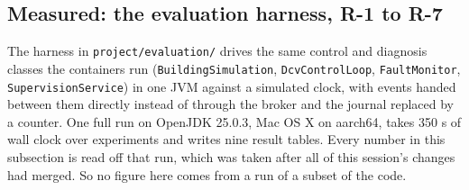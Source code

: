 \subsection{Measured: the evaluation harness, R-1 to R-7}\label{sec:11.2}

The harness in \texttt{project/evaluation/} drives the same control and diagnosis classes the
containers run (\texttt{BuildingSimulation}, \texttt{DcvControlLoop}, \texttt{FaultMonitor},
\texttt{SupervisionService}) in one JVM against a simulated clock, with events handed between them
directly instead of through the broker and the journal replaced by a counter. One full run on
OpenJDK 25.0.3, Mac OS X on aarch64, takes 350 s of wall clock over \factExperiments{} experiments and writes nine
result tables. Every number in this subsection is read off that run, which was taken after all of
this session's changes had merged. So no figure here comes from a run of a subset of the code.

